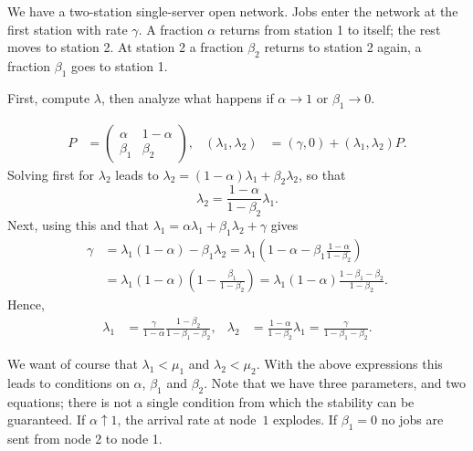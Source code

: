 \documentclass[queueing-book.tex]{subfiles}
\begin{document}
\begin{exercise}\label{ex:47}
We have a two-station single-server open network.
Jobs enter the network at the first station with rate $\gamma$.
A fraction $\alpha$ returns from station 1 to itself; the rest moves to station 2.
At station 2 a fraction $\beta_2$ returns to station 2 again, a fraction $\beta_1$ goes to station 1.
\begin{hint}
First, compute $\lambda$, then analyze what happens if $\alpha\to 1$ or $\beta_1\to 0$.
\end{hint}
\begin{solution}
 \begin{align*}
 P &=
 \begin{pmatrix}
 \alpha & 1- \alpha \\
 \beta_1 & \beta_2
 \end{pmatrix},
&
 (\lambda_1, \lambda_2) &= (\gamma, 0) + (\lambda_1, \lambda_2) P.
 \end{align*}
 Solving first for $\lambda_2$ leads to $\lambda_2 = (1-\alpha) \lambda_1 + \beta_2 \lambda_2$, so that
\begin{equation*}
 \lambda_2 = \frac{1-\alpha}{1-\beta_2} \lambda_1.
\end{equation*}
Next, using this and that $\lambda_1 = \alpha \lambda_1 + \beta_1 \lambda_2 + \gamma$ gives
\begin{equation*}
 \begin{split}
\gamma
&= \lambda_1(1-\alpha) - \beta_1\lambda_2
= \lambda_1\left(1-\alpha - \beta_1\frac{1-\alpha}{1-\beta_2}\right) \\
&= \lambda_1(1-\alpha)\left(1 - \frac{\beta_1 }{1-\beta_2}\right)
= \lambda_1(1-\alpha)\frac{1-\beta_1-\beta_2 }{1-\beta_2}.
 \end{split}
\end{equation*}
Hence,
\begin{align*}
 \lambda_1 &= \frac\gamma{1-\alpha}\frac{1-\beta_2}{1-\beta_1-\beta_2},&
 \lambda_2 &= \frac{1-\alpha}{1-\beta_2} \lambda_1 = \frac\gamma{1-\beta_1-\beta_2}.
\end{align*}

We want of course that $\lambda_1 < \mu_1$ and $\lambda_2 < \mu_2$.
With the above expressions this leads to conditions on $\alpha$, $\beta_1$ and $\beta_2$.
Note that we have three parameters, and two equations; there is not a single condition from which the stability can be guaranteed.
If $\alpha\uparrow 1$, the arrival rate at node~$1$ explodes.
If $\beta_1=0$ no jobs are sent from node 2 to node 1.
\end{solution}
\end{exercise}
\end{document}
